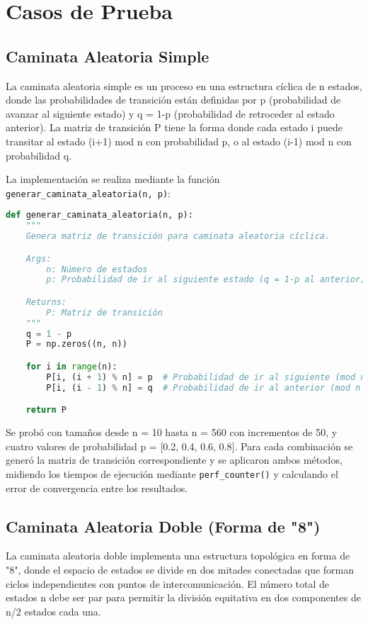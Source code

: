 \section{Casos de Prueba}

\subsection{Caminata Aleatoria Simple}

La caminata aleatoria simple es un proceso en una estructura cíclica de n estados, donde las probabilidades de transición están definidas por p (probabilidad de avanzar al siguiente estado) y q = 1-p (probabilidad de retroceder al estado anterior). La matriz de transición P tiene la forma donde cada estado i puede transitar al estado (i+1) mod n con probabilidad p, o al estado (i-1) mod n con probabilidad q.

La implementación se realiza mediante la función \texttt{generar\_caminata\_aleatoria(n, p)}:

\begin{lstlisting}[language=Python]
def generar_caminata_aleatoria(n, p):
    """
    Genera matriz de transición para caminata aleatoria cíclica.

    Args:
        n: Número de estados
        p: Probabilidad de ir al siguiente estado (q = 1-p al anterior)

    Returns:
        P: Matriz de transición
    """
    q = 1 - p
    P = np.zeros((n, n))

    for i in range(n):
        P[i, (i + 1) % n] = p  # Probabilidad de ir al siguiente (mod n para ciclo)
        P[i, (i - 1) % n] = q  # Probabilidad de ir al anterior (mod n para ciclo)

    return P
\end{lstlisting}

Se probó con tamaños desde n = 10 hasta n = 560 con incrementos de 50, y cuatro valores de probabilidad p = [0.2, 0.4, 0.6, 0.8]. Para cada combinación se generó la matriz de transición correspondiente y se aplicaron ambos métodos, midiendo los tiempos de ejecución mediante \texttt{perf\_counter()} y calculando el error de convergencia entre los resultados.

\subsection{Caminata Aleatoria Doble (Forma de "8")}

La caminata aleatoria doble implementa una estructura topológica en forma de "8", donde el espacio de estados se divide en dos mitades conectadas que forman ciclos independientes con puntos de intercomunicación. El número total de estados n debe ser par para permitir la división equitativa en dos componentes de n/2 estados cada una.

